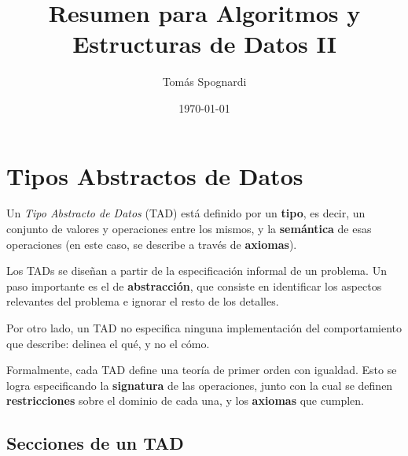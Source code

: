 \documentclass{article}
\title{Resumen para Algoritmos y Estructuras de Datos II}
\author{Tomás Spognardi}
\date{\today}
\begin{document}
\maketitle

\tableofcontents

\newpage

\section{Tipos Abstractos de Datos}

Un \textit{Tipo Abstracto de Datos} (TAD) está definido por un \textbf{tipo}, es decir, un conjunto de valores y operaciones entre los mismos, y la \textbf{semántica} de esas operaciones (en este caso, se describe a través de \textbf{axiomas}).

Los TADs se diseñan a partir de la especificación informal de un problema. Un paso importante es el de \textbf{abstracción}, que consiste en identificar los aspectos relevantes del problema e ignorar el resto de los detalles.

Por otro lado, un TAD no especifica ninguna implementación del comportamiento que describe: delinea el qué, y no el cómo.

Formalmente, cada TAD define una teoría de primer orden con igualdad. Esto se logra especificando la \textbf{signatura} de las operaciones, junto con la cual se definen \textbf{restricciones} sobre el dominio de cada una, y los \textbf{axiomas} que cumplen.

\subsection{Secciones de un TAD}
\end{document}
